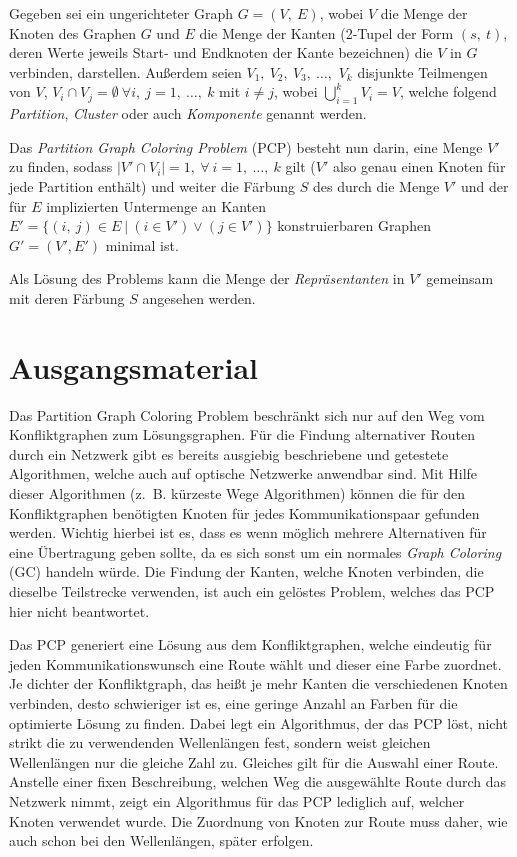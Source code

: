 Gegeben sei ein ungerichteter Graph $G = (V,\ E)$, wobei $V$ die Menge der Knoten des Graphen $G$ und $E$ die Men\-ge der Kan\-ten (2-Tupel der Form $(s,\ t)$, deren Werte jeweils Start- und Endknoten der Kante bezeichnen) die $V$ in $G$ verbinden, darstellen. Außerdem seien $V_1,\ V_2,\ V_3,\ \ldots,$ $V_k$ disjunkte Teilmengen von $V$, $V_i \cap V_j = \emptyset \ \forall i,\ j = 1,\ \ldots,\ k$ mit $i \not = j$, wobei $\bigcup_{i = 1}^k V_i = V$, welche folgend \textit{Partition}, \textit{Cluster} oder auch \textit{Komponente} genannt werden.

Das \textit{Partition Graph Coloring Problem} (PCP) besteht nun darin, eine Menge $V'$ zu finden, sodass $|V' \cap V_i| = 1,\ \forall\ i = 1,\ \ldots,\ k$ gilt ($V'$ also genau einen Knoten für jede Partition enthält) und weiter die Färbung $S$ des durch die Menge $V'$ und der für $E$ implizierten Untermenge an Kanten $E' = \{(i,\ j) \in E\ |\ (i \in V') \vee (j \in V') \}$ konstruierbaren Graphen $G' = (V', E')$ minimal ist.

Als Lösung des Problems kann die Menge der \textit{Repräsentanten} in $V'$ gemeinsam mit deren Färbung $S$ angesehen werden.

\section{Ausgangsmaterial}
Das Partition Graph Coloring Problem beschränkt sich nur auf den Weg vom Konfliktgraphen zum Lösungsgraphen. Für die Findung alternativer Routen durch ein Netzwerk gibt es 
bereits ausgiebig beschriebene und getestete Algorithmen, welche auch auf optische Netzwerke anwendbar sind. Mit Hilfe dieser Algorithmen (z.\ B. kürzeste Wege Algorithmen) können die für den
Konfliktgraphen benötigten Knoten für jedes Kommunikationspaar gefunden werden. Wichtig hierbei ist es, dass es wenn möglich mehrere Alternativen für eine Übertragung geben sollte,
da es sich sonst um ein normales \emph{Graph Coloring} (GC) handeln würde. Die Findung der Kanten, welche Knoten verbinden, die dieselbe Teilstrecke verwenden, ist auch ein
gelöstes Problem, welches das PCP hier nicht beantwortet.

Das PCP generiert eine Lösung aus dem Konfliktgraphen, welche eindeutig für jeden Kommunikationswunsch eine Route wählt und dieser eine Farbe zuordnet. Je dichter der Konfliktgraph, das heißt
je mehr Kanten die verschiedenen Knoten verbinden, desto schwieriger ist es, eine geringe Anzahl an Farben für die optimierte Lösung zu finden. Dabei legt ein Algorithmus, der das
PCP löst, nicht strikt die zu verwendenden Wellenlängen fest, sondern weist gleichen Wellenlängen nur die gleiche Zahl zu. Gleiches gilt für die Auswahl einer Route. Anstelle
einer fixen Beschreibung, welchen Weg die ausgewählte Route durch das Netzwerk nimmt, zeigt ein Algorithmus für das PCP lediglich auf, welcher Knoten verwendet wurde. 
Die Zuordnung von Knoten zur Route muss daher, wie auch schon bei den Wellenlängen, später erfolgen.

